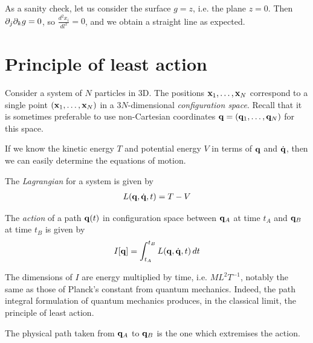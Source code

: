 \documentclass{../template/note}
\begin{document}
    \begin{example*}
        As a sanity check, let us consider the surface $g = z$, i.e. the plane $z=0$. Then $\partial_j \partial_k g = 0$, so $\frac{d^2x_i}{dl^2} = 0$, and we obtain a straight line as expected.
    \end{example*}
    
    \section{Principle of least action}

    Consider a system of $N$ particles in 3D. The positions $\V x_1, \dots, \V x_N$ correspond to a single point $(\V x_1, \dots, \V x_N)$ in a $3N$-dimensional \emph{configuration space}. Recall that it is sometimes preferable to use non-Cartesian coordinates $\V q = (\V q_1, \dots, \V q_N)$ for this space. 

    If we know the kinetic energy $T$ and potential energy $V$ in terms of $\V q$ and $\dot{\V q}$, then we can easily determine the equations of motion.

    \begin{definition}[Lagrangian]
        The \emph{Lagrangian} for a system is given by
        \begin{align*}
            L(\V q, \dot{\V q}, t) = T-V
        \end{align*}
    \end{definition}
    
    \begin{definition}[Action]
        The \emph{action} of a path $\V q(t)$ in configuration space between $\V q_A$ at time $t_A$ and $\V q_B$ at time $t_B$ is given by
        \begin{align*}
            I[\V q] = \int_{t_A}^{t_B} L(\V q, \dot{\V q}, t) \D t
        \end{align*}
    \end{definition}
    
    \begin{remark*}
        The dimensions of $I$ are energy multiplied by time, i.e. $\si{ML^2 T^{-1}}$, notably the same as those of Planck's constant from quantum mechanics. Indeed, the path integral formulation of quantum mechanics produces, in the classical limit, the principle of least action.
    \end{remark*}
    
    \begin{proposition}
        The physical path taken from $\V q_A$ to $\V q_B$ is the one which extremises the action.
    \end{proposition}
    
\end{document}
